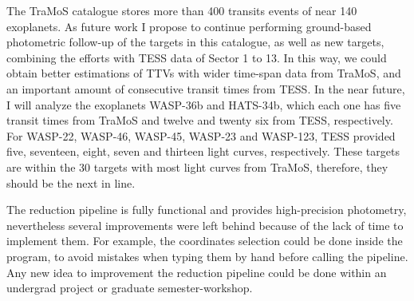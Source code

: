 The TraMoS catalogue stores more than 400 transits events of near 140 exoplanets. As future work I propose to continue performing ground-based photometric follow-up of the targets in this catalogue, as well as new targets, combining the efforts with TESS data of Sector 1 to 13. In this way, we could obtain better estimations of TTVs with wider time-span data from TraMoS, and an important amount of consecutive transit times from TESS. In the near future, I will analyze the exoplanets WASP-36b and HATS-34b, which each one has five transit times from TraMoS and twelve and twenty six from TESS, respectively. For WASP-22, WASP-46, WASP-45, WASP-23 and WASP-123, TESS provided five, seventeen, eight, seven and thirteen light curves, respectively. These targets are within the 30 targets with most light curves from TraMoS, therefore, they should be the next in line.

The reduction pipeline is fully functional and provides high-precision photometry, nevertheless several improvements were left behind because of the lack of time to implement them. For example, the coordinates selection could be done inside the program, to avoid mistakes when typing them by hand before calling the pipeline. Any new idea to improvement the reduction pipeline could be done within an undergrad project or graduate semester-workshop.
 